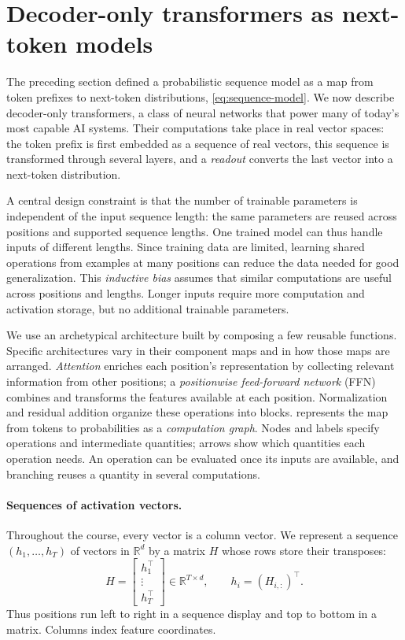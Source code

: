 \documentclass[11pt,twoside]{article}
\newcommand{\R}{\mathbb R}
\theoremstyle{plain}
\theoremstyle{definition}
\theoremstyle{remark}
\begin{document}
\section{Decoder-only transformers as next-token models}

The preceding section defined a probabilistic sequence model as a map from
token prefixes to next-token distributions, \eqref{eq:sequence-model}.
We now describe decoder-only transformers, a class of neural networks that
power many of today's most capable AI systems. Their computations take place
in real vector spaces: the token prefix is first embedded as a sequence of
real vectors, this sequence is transformed through several layers, and a
\emph{readout} converts the last vector into a next-token distribution.

A central design constraint is that the number of trainable parameters is
independent of the input sequence length: the same parameters are reused
across positions and supported sequence lengths. One trained model can thus
handle inputs of different lengths. Since training data are limited, learning
shared operations from examples at many positions can reduce the data needed
for good generalization. This \emph{inductive bias} assumes that similar
computations are useful across positions and lengths.
Longer inputs require more
computation and activation storage, but no additional trainable parameters.

We use an archetypical architecture built by composing a few reusable
functions. Specific architectures vary in their component maps and in how
those maps are arranged.
\emph{Attention} enriches each position's representation by collecting
relevant information from other positions; a \emph{positionwise feed-forward
network} (FFN) combines and transforms the features available at each
position. Normalization and residual addition organize these
operations into blocks.  represents the map from
tokens to probabilities as a \emph{computation graph}. Nodes and labels specify
operations and intermediate quantities; arrows show which quantities each
operation needs. An operation can be evaluated once its inputs are available,
and branching reuses a quantity in several computations.

\paragraph{Sequences of activation vectors.}
Throughout the course, every vector is a column vector. We represent a
sequence $(h_1,\ldots,h_T)$ of vectors in $\R^d$ by a matrix $H$ whose rows
store their transposes:
\begin{equation}
H=
\begin{bmatrix}
h_1^\top\\[-1mm]
\vdots\\[-1mm]
h_T^\top
\end{bmatrix}
\in\R^{T\times d},
\qquad h_i=(H_{i,:})^\top.
\label{eq:row-stacking}
\end{equation}
Thus positions run left to right in a sequence display and top to bottom
in a matrix. Columns index feature coordinates.
\end{document}

